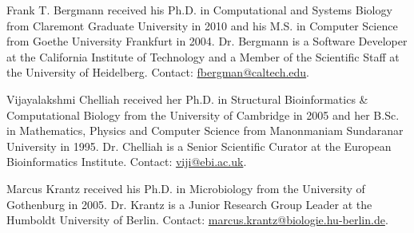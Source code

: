 \documentclass[journal,transmag]{IEEEtran}
\begin{document}
\begin{IEEEbiography}{Frank T. Bergmann}
received his Ph.D. in Computational and Systems Biology from Claremont Graduate University in 2010 and his M.S. in Computer Science from Goethe University Frankfurt in 2004.
Dr. Bergmann is a Software Developer at the California Institute of Technology and a Member of the Scientific Staff at the University of Heidelberg.
Contact: \href{mailto:fbergman@caltech.edu}{fbergman@caltech.edu}.
\end{IEEEbiography}

\begin{IEEEbiography}{Vijayalakshmi Chelliah}
received her Ph.D. in Structural Bioinformatics \& Computational Biology from the University of Cambridge in 2005 and her B.Sc. in Mathematics, Physics and Computer Science from Manonmaniam Sundaranar University in 1995.
Dr. Chelliah is a Senior Scientific Curator at the European Bioinformatics Institute.
Contact: \href{mailto:viji@ebi.ac.uk}{viji@ebi.ac.uk}.
\end{IEEEbiography}

\begin{IEEEbiography}{Marcus Krantz}
received his Ph.D. in Microbiology from the University of Gothenburg in 2005.
Dr. Krantz is a Junior Research Group Leader at the Humboldt University of Berlin.
Contact: \href{mailto:marcus.krantz@biologie.hu-berlin.de}{marcus.krantz@biologie.hu-berlin.de}.
\end{IEEEbiography}
\end{document}
